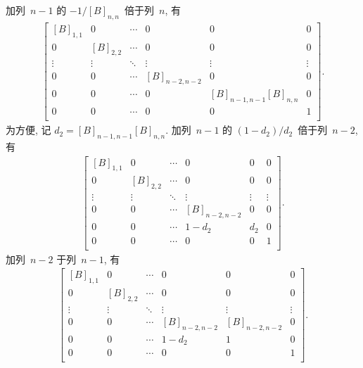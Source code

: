 加列~\(n-1\) 的 \(-1/[B]_{n,n}\)~倍于列~\(n\), 有
\begin{align*}
    \begin{bmatrix}
        [B]_{1,1} & 0         & \cdots & 0             & 0                       & 0      \\
        0         & [B]_{2,2} & \cdots & 0             & 0                       & 0      \\
        \vdots    & \vdots    & \ddots & \vdots        & \vdots                  & \vdots \\
        0         & 0         & \cdots & [B]_{n-2,n-2} & 0                       & 0      \\
        0         & 0         & \cdots & 0             & [B]_{n-1,n-1} [B]_{n,n} & 0      \\
        0         & 0         & \cdots & 0             & 0                       & 1      \\
    \end{bmatrix}.
\end{align*}
为方便, 记 \(d_2 = [B]_{n-1,n-1} [B]_{n,n}\).
加列~\(n-1\) 的 \((1 - d_2)/d_2\)~倍于列~\(n-2\), 有
\begin{align*}
    \begin{bmatrix}
        [B]_{1,1} & 0         & \cdots & 0             & 0      & 0      \\
        0         & [B]_{2,2} & \cdots & 0             & 0      & 0      \\
        \vdots    & \vdots    & \ddots & \vdots        & \vdots & \vdots \\
        0         & 0         & \cdots & [B]_{n-2,n-2} & 0      & 0      \\
        0         & 0         & \cdots & 1 - d_2       & d_2    & 0      \\
        0         & 0         & \cdots & 0             & 0      & 1      \\
    \end{bmatrix}.
\end{align*}
加列~\(n-2\) 于列~\(n-1\), 有
\begin{align*}
    \begin{bmatrix}
        [B]_{1,1} & 0         & \cdots & 0             & 0             & 0      \\
        0         & [B]_{2,2} & \cdots & 0             & 0             & 0      \\
        \vdots    & \vdots    & \ddots & \vdots        & \vdots        & \vdots \\
        0         & 0         & \cdots & [B]_{n-2,n-2} & [B]_{n-2,n-2} & 0      \\
        0         & 0         & \cdots & 1 - d_2       & 1             & 0      \\
        0         & 0         & \cdots & 0             & 0             & 1      \\
    \end{bmatrix}.
\end{align*}
